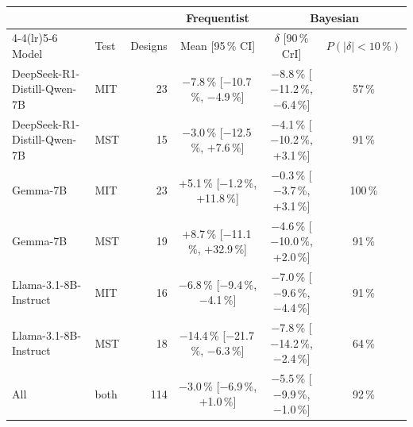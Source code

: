 \begin{tabular}{llrccc}
\toprule
 & & & Frequentist & \multicolumn{2}{c}{Bayesian} \\
\cmidrule(lr){4-4}\cmidrule(lr){5-6}
Model & Test & Designs & Mean [95\,\% CI] & $\delta$ [90\,\% CrI] & $P(|\delta|<10\,\%)$ \\
\midrule
DeepSeek-R1-Distill-Qwen-7B & MIT & 23 & \ensuremath{-}7.8\,\% [\ensuremath{-}10.7\,\%, \ensuremath{-}4.9\,\%] & \ensuremath{-}8.8\,\% [\ensuremath{-}11.2\,\%, \ensuremath{-}6.4\,\%] & 57\,\% \\
DeepSeek-R1-Distill-Qwen-7B & MST & 15 & \ensuremath{-}3.0\,\% [\ensuremath{-}12.5\,\%, +7.6\,\%] & \ensuremath{-}4.1\,\% [\ensuremath{-}10.2\,\%, +3.1\,\%] & 91\,\% \\
Gemma-7B & MIT & 23 & +5.1\,\% [\ensuremath{-}1.2\,\%, +11.8\,\%] & \ensuremath{-}0.3\,\% [\ensuremath{-}3.7\,\%, +3.1\,\%] & 100\,\% \\
Gemma-7B & MST & 19 & +8.7\,\% [\ensuremath{-}11.1\,\%, +32.9\,\%] & \ensuremath{-}4.6\,\% [\ensuremath{-}10.0\,\%, +2.0\,\%] & 91\,\% \\
Llama-3.1-8B-Instruct & MIT & 16 & \ensuremath{-}6.8\,\% [\ensuremath{-}9.4\,\%, \ensuremath{-}4.1\,\%] & \ensuremath{-}7.0\,\% [\ensuremath{-}9.6\,\%, \ensuremath{-}4.4\,\%] & 91\,\% \\
Llama-3.1-8B-Instruct & MST & 18 & \ensuremath{-}14.4\,\% [\ensuremath{-}21.7\,\%, \ensuremath{-}6.3\,\%] & \ensuremath{-}7.8\,\% [\ensuremath{-}14.2\,\%, \ensuremath{-}2.4\,\%] & 64\,\% \\
\midrule
All & both & 114 & \ensuremath{-}3.0\,\% [\ensuremath{-}6.9\,\%, +1.0\,\%] & \ensuremath{-}5.5\,\% [\ensuremath{-}9.9\,\%, \ensuremath{-}1.0\,\%] & 92\,\% \\
\bottomrule
\end{tabular}

